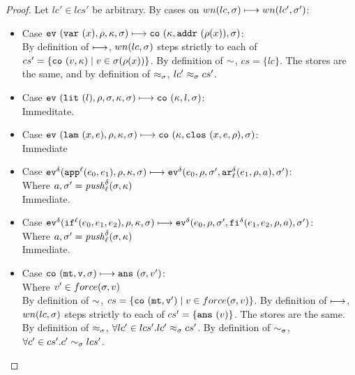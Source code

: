 \documentclass[preprint,onecolumn,9pt]{sigplanconf} %
\begin{document}
\begin{proof}
Let $lc' \in lcs'$ be arbitrary.
By cases on $wn(lc,\msto) \machstep wn(lc', \msto')$:
\begin{itemize}
\item{Case $\ev{\svar{\mvar}, \menv, \mkont, \msto} \machstep \co{\mkont,
    \saddr{\menv(\mvar)}, \msto}$: \\ By definition of $\machstep$,
  $wn(lc,\msto)$ steps strictly to each of $cs' = \{\co{\mval, \mkont} \mid \mval \in \msto(\menv(\mvar))\}$.  By definition of
  $\capprx{}{}$, $cs = \{lc\}$. The stores are the same, and by
  definition of $\lapprx{}{\msto}{}$, $\lapprx{lc'}{\msto}{cs'}$.}
\item{Case $\ev{\slit{\mlit}, \menv, \msto, \mkont, \msto} \machstep
            \co{\mkont, \mlit, \msto}$: \\
      Immeditate.}
\item{Case $\ev{\slam{\mvar}{\mexp}, \menv, \mkont, \msto} \machstep
            \co{\mkont, \clos{\mvar, \mexp, \menv}, \msto}$: \\
      Immediate}
\item{Case $\ev[^\mcntr]{\sapp[^\mlab]{\mexp_0}{\mexp_1}, \menv, \mkont, \msto} \machstep
            \ev[^\mcntr]{\mexp_0, \menv, \msto', \kar[^\mcntr_\mlab]{\mexp_1, \menv, \maddr}, \msto'}$: \\
      Where $\maddr, \msto' = \mathit{push}_\mlab^\mcntr(\msto,\mkont)$ \\
      Immediate.}
\item{Case $\ev[^\mcntr]{\sif[^\mlab]{\mexp_0}{\mexp_1}{\mexp_2}, \menv, \mkont, \msto} \machstep
            \ev[^\mcntr]{\mexp_0, \menv, \msto', \kif[^\mcntr]{\mexp_1, \mexp_2, \menv, \maddr}, \msto'}$: \\
      Where $\maddr, \msto' = \mathit{push}_\mlab^\mcntr(\msto,\mkont)$ \\
      Immediate.}
\item{Case $\co{\kmt, \mval, \msto} \machstep \ans{\msto, \mval'}$: \\
      Where $\mval' \in force(\msto, \mval)$ \\
      By definition of $\capprx{}{}$, $cs = \{\co{\kmt, \mval'} \mid \mval \in force(\msto, \mval)\}$.
      By definition of $\machstep$, $wn(lc,\msto)$ steps strictly to
      each of $cs' = \{\ans{\mval}\}$. The stores are the same.
      By definition of $\lapprx{}{\msto}{}$, $\forall lc' \in lcs'. \lapprx{lc'}{\msto}{cs'}$.
      By definition of $\apprx{}{\msto}{}$, $\forall c' \in cs'. \apprx{c'}{\msto}{lcs'}$.
}
\end{itemize}
\end{proof}
\end{document}
